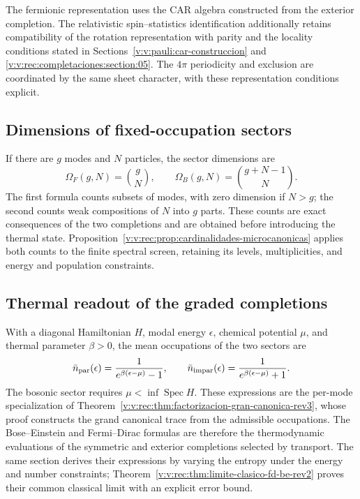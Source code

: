The fermionic representation uses the CAR algebra constructed from the
exterior completion. The relativistic spin--statistics
identification additionally retains compatibility of the rotation
representation with parity and the locality conditions stated in
Sections~\ref{v:v:pauli:car-construccion} and
\ref{v:v:rec:completaciones:section:05}. The \(4\pi\) periodicity and
exclusion are coordinated by the same sheet character, with these
representation conditions explicit.

\subsection{Dimensions of fixed-occupation sectors}
\label{v:v:rec:completaciones:section:07}

If there are \(g\) modes and \(N\) particles, the sector dimensions are
\begin{equation}
 \Omega_F(g,N)=\binom gN,
 \qquad
 \Omega_B(g,N)=\binom{g+N-1}{N}.
 \label{v:v:ocupacion:eq:dimensiones-sectores}
\end{equation}
The first formula counts subsets of modes, with zero dimension if
\(N>g\); the second counts weak compositions of \(N\) into \(g\) parts.
These counts are exact consequences of the two completions and are
obtained before introducing the thermal state.
Proposition~\ref{v:v:rec:prop:cardinalidades-microcanonicas} applies both
counts to the finite spectral screen, retaining its levels,
multiplicities, and energy and population constraints.

\subsection{Thermal readout of the graded completions}
\label{v:v:ocupacion:lectura-termica}

With a diagonal Hamiltonian \(H\), modal energy \(\epsilon\), chemical
potential \(\mu\), and thermal parameter \(\beta>0\), the mean occupations
of the two sectors are
\begin{equation}
 \bar n_{\rm par}(\epsilon)
 =\frac{1}{e^{\beta(\epsilon-\mu)}-1},
 \qquad
 \bar n_{\rm impar}(\epsilon)
 =\frac{1}{e^{\beta(\epsilon-\mu)}+1}.
 \label{v:v:ocupacion:eq:leyes-por-modo}
\end{equation}
The bosonic sector requires \(\mu<\inf\operatorname{Spec}H\).
These expressions are the per-mode specialization of
Theorem~\ref{v:v:rec:thm:factorizacion-gran-canonica-rev3}, whose proof
constructs the grand canonical trace from the admissible occupations.
The Bose--Einstein and Fermi--Dirac formulas are therefore the
thermodynamic evaluations of the symmetric and exterior completions
selected by transport. The same section derives their expressions
by varying the entropy under the energy and number constraints;
Theorem~\ref{v:v:rec:thm:limite-clasico-fd-be-rev2} proves their
common classical limit with an explicit error bound.
